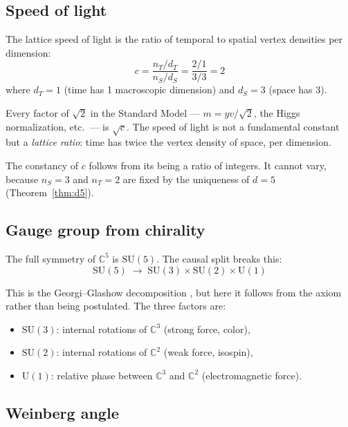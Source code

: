 \subsection{Speed of light}

The lattice speed of light is the ratio of temporal to spatial vertex densities per dimension:
\begin{equation}
\boxed{c = \frac{n_T / d_T}{n_S / d_S} = \frac{2/1}{3/3} = 2}
\label{eq:speed_of_light}
\end{equation}
where $d_T = 1$ (time has 1 macroscopic dimension) and $d_S = 3$ (space has 3).

Every factor of $\sqrt{2}$ in the Standard Model --- $m = yv/\sqrt{2}$, the Higgs normalization, etc.\ --- is $\sqrt{c}$. The speed of light is not a fundamental constant but a \emph{lattice ratio}: time has twice the vertex density of space, per dimension.

\begin{remark}
The constancy of $c$ follows from its being a ratio of integers. It cannot vary, because $n_S = 3$ and $n_T = 2$ are fixed by the uniqueness of $d = 5$ (Theorem~\ref{thm:d5}).
\end{remark}

\subsection{Gauge group from chirality}

The full symmetry of $\mathbb{C}^5$ is $\text{SU}(5)$. The causal split breaks this:
\begin{equation}
\text{SU}(5) \;\to\; \text{SU}(3) \times \text{SU}(2) \times \text{U}(1)
\end{equation}

This is the Georgi--Glashow decomposition \cite{GeorgiGlashow}, but here it follows from the axiom rather than being postulated. The three factors are:
\begin{itemize}
\item $\text{SU}(3)$: internal rotations of $\mathbb{C}^3$ (strong force, color),
\item $\text{SU}(2)$: internal rotations of $\mathbb{C}^2$ (weak force, isospin),
\item $\text{U}(1)$: relative phase between $\mathbb{C}^3$ and $\mathbb{C}^2$ (electromagnetic force).
\end{itemize}

\subsection{Weinberg angle}

